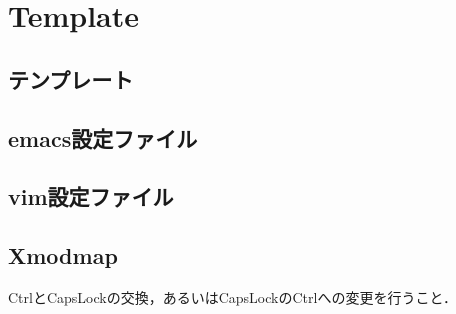 \section{Template}

\subsection{テンプレート}


\subsection{emacs設定ファイル}


\subsection{vim設定ファイル}
%

\subsection{Xmodmap}
CtrlとCapsLockの交換，あるいはCapsLockのCtrlへの変更を行うこと．

